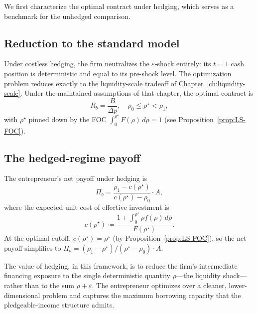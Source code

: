 \documentclass[11pt,a4paper,oneside]{book}
\def\leq{\leqslant}
\theoremstyle{plain}
\theoremstyle{definition}
\theoremstyle{remark}
\numberwithin{equation}{chapter}
\begin{document}
We first characterize the optimal contract under hedging, which serves as a benchmark for the unhedged comparison.

\subsection{Reduction to the standard model}

Under costless hedging, the firm neutralizes the $\varepsilon$-shock entirely: its $t=1$ cash position is deterministic and equal to its pre-shock level.
The optimization problem reduces exactly to the liquidity-scale tradeoff of Chapter~\ref{ch:liquidity-scale}.
Under the maintained assumptions of that chapter, the optimal contract is
\begin{equation}\label{eq:RM-hedged-contract}
  R_b = \frac{B}{\Delta p},
  \quad
  \rho_0 \leq \rho^\star < \rho_1,
\end{equation}
with $\rho^\star$ pinned down by the FOC $\int_0^{\rho^\star} F(\rho) \, d\rho = 1$ (see Proposition~\ref{prop:LS-FOC}).

\subsection{The hedged-regime payoff}

The entrepreneur's net payoff under hedging is
\begin{equation}\label{eq:RM-hedged-payoff}
  \Pi_b = \frac{\rho_1 - c(\rho^\star)}{c(\rho^\star) - \rho_0} \cdot A,
\end{equation}
where the expected unit cost of effective investment is
\begin{equation}\label{eq:RM-c-hedged}
  c(\rho^\star) \coloneqq \frac{1 + \int_0^{\rho^\star} \rho f(\rho) \, d\rho}{F(\rho^\star)}.
\end{equation}
At the optimal cutoff, $c(\rho^\star) = \rho^\star$ (by Proposition~\ref{prop:LS-FOC}), so the net payoff simplifies to $\Pi_b = (\rho_1 - \rho^\star)/(\rho^\star - \rho_0) \cdot A$.

The value of hedging, in this framework, is to reduce the firm's intermediate financing exposure to the single deterministic quantity $\rho$---the liquidity shock---rather than to the sum $\rho + \varepsilon$.
The entrepreneur optimizes over a cleaner, lower-dimensional problem and captures the maximum borrowing capacity that the pledgeable-income structure admits.

\end{document}
